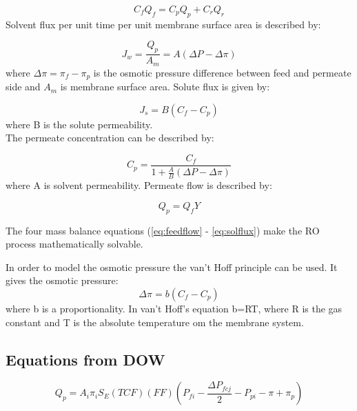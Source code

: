 \begin{equation}
\label{eq:mass}
C_{f}Q_{f}=C_{p}Q_{p}+C_{r}Q_{r}
\end{equation}
Solvent flux per unit time per unit membrane surface area is described by:

\begin{equation}
\label{eq:flux}
J_{w}=\frac{Q_{p}}{A_{m}}= A(\Delta P - \Delta \pi)
\end{equation}
where $\Delta\pi = \pi_{f} - \pi_{p}$ is the osmotic pressure difference between feed and permeate side and $A_{m}$ is membrane surface area.
Solute flux is given by:

\begin{equation}
\label{eq:solflux}
J_{s}=B(C_{f}- C_{p})
\end{equation}
 where B is the solute permeability.
\\The permeate concentration can be described by:

\begin{equation}
\label{eq:permcond}
C_{p}=\frac{C_{f}}{1+\frac{A}{B}(\Delta P - \Delta\pi)}
\end{equation}
where A is solvent permeability.
Permeate flow is described by:

\begin{equation}
\label{eq:permflow}
Q_{p}=Q_{f}Y
\end{equation}

The four mass balance equations (\ref{eq:feedflow} - \ref{eq:solflux}) make the RO process mathematically solvable.

In order to model the osmotic pressure the van't Hoff principle can be used. It gives the osmotic pressure:
\begin{equation}
\label{eq:posm}
\Delta\pi=b(C_{f}-C_{p})
\end{equation}
where b is a proportionality. In van't Hoff's equation b=RT, where R is the gas constant and T is the absolute temperature om the membrane system. 

\subsection{Equations from DOW}
\mathleft
\begin{equation}
\label{eq:pQ}
Q_{p}=A_{i}\pi_{i} S_{E}(TCF)(FF)(P_{fi}-\frac{\Delta P_{fcj}}{2}-P_{pi}-\pi+\pi_{p})
\end{equation}


